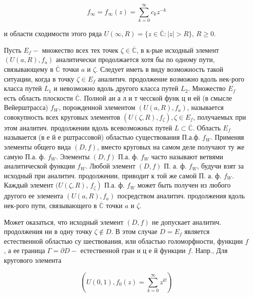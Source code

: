 \documentclass[10pt]{article}
\begin{document}
\[

f_{\infty}=f_{\infty}(z)=\sum_{k=0}^{\infty} c_{k} z^{-k}

\]



и области сходимости этого ряда $U(\infty, R)=\{z \in \overline{\mathbb{C}}:|z|>R\}$, $R \geqslant 0$.



Пусть $E_{f}-$ множество всех тех точек $\zeta \in \overline{\mathbb{C}}$, в к-рые исходный элемент $\left(U(a, R), f_{a}\right)$ аналитически продолжается хотя бы по одному пути, связывающему в $\overline{\mathbb{C}}$ точки $a$ и $\zeta$. Следует иметь в виду возможность такой ситуации, когда в точку $\zeta \in E_{f}$ аналитич. продолжение возможно вдоль нек-рого класса путей $L_{1}$ и невозможно вдоль другого класса путей $L_{2}$. Множество $E_{f}$ есть область плоскости $\overline{\mathbb{C}}$. Полной ан а л и т чесской функ ц и ей (в смысле Вейерштрасса) $f_{W}$, порожденной элементом $\left(U(a, R), f_{a}\right)$, называется совокупность всех круговых элементов $\left(U(\zeta, R), f_{\zeta}\right), \zeta \in E_{f}$, получаемых при этом аналитич. продолжении вдоль всевозможных путей $L \subset \overline{\mathbb{C}}$. Область $E_{f}$ называется (в е й е рштрассовой) областью существования П.а.ф. $f_{W}$. Применяя элементы общего вида $(D, f)$, вместо круговых на самом деле получают ту же самую П.а. ф. $f_{W}$. Элементы $(D, f)$ П.а. ф. $f_{W}$ часто называют ветвями аналитической функции $f_{W}$. Любой элемент $(D, f)$ П. а. ф. $f_{W}$, будучи взят за исходный при аналитич. продолжении, приводит к той же самой П. а. ф. $f_{W}$. Каждый элемент $(U(\zeta, R)$, $\left.f_{\zeta}\right)$ П.а. ф. $f_{W}$ может быть получен из любого другого ее элемента $\left(U(a, R), f_{a}\right)$ посредством аналитич. продолжения вдоль нек-рого пути, связывающего в $\overline{\mathbb{C}}$ точки $a$ и $\zeta$.



Может оказаться, что исходный элемент $(D, f)$ не допускает аналитич. продолжения ни в одну точку $\zeta \notin D$. В этом случае $D=E_{f}$ является естественной областью су шествования, или областью голоморфности, функции $f$, а ее граница $\Gamma=\partial D-$ естественной гран и ц е й функции $f$. Напр., Для кругового элемента



\[

\left(U(0,1), f_{0}(z)=\sum_{k=0}^{\infty} z^{k !}\right)

\]
\end{document}
